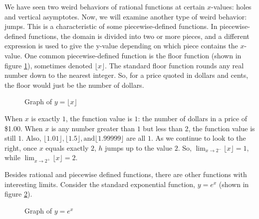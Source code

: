 We have seen two weird behaviors of rational functions at certain $x$-values: holes 
and vertical asymptotes. Now, we will examine another type of weird behavior: jumps. 
This is a characteristic of some piecewise-defined functions. In piecewise-defined 
functions, the domain is divided into two or more pieces, and a different 
expression is used to give the y-value depending on which piece contains the $x$-
value. One common piecewise-defined function is the floor function (shown in 
figure \ref{fig:floor}), sometimes denoted $\lfloor x \rfloor$. The standard 
floor function rounds any real number down to the nearest integer. So, for a 
price quoted in dollars and cents, the floor would just be the number of 
dollars.

\begin{figure}[htbp]
  \centering
  \caption{Graph of \( y = \lfloor x \rfloor \)}
  \label{fig:floor}
\end{figure}	

When $x$ is exactly $1$, the function value is $1$: the number of dollars in a 
price of \$1.00. When $x$ is any number greater than $1$ but less than $2$, the 
function value is still $1$. Also, $ \lfloor 1.01 \rfloor, \lfloor 1.5 \rfloor, 
\text{and} \lfloor 1.99999 \rfloor$ are all $1$. As we continue to look to the 
right, once $x$ equals exactly $2$, $h$ jumps up to the value $2$. So, 
$ \lim_{x \rightarrow 2^-} \lfloor x \rfloor = 1 $, while 
$ \lim_{x \rightarrow 2^+} \lfloor x \rfloor = 2 $.

Besides rational and piecewise defined functions, there are other functions with 
interesting limits. Consider the standard exponential function, $y = e^x$ 
(shown in figure \ref{fig:exponent}).

\begin{figure}[htbp]
  \centering
  \caption{Graph of \( y = e^x \)}
  \label{fig:exponent}
\end{figure}	

